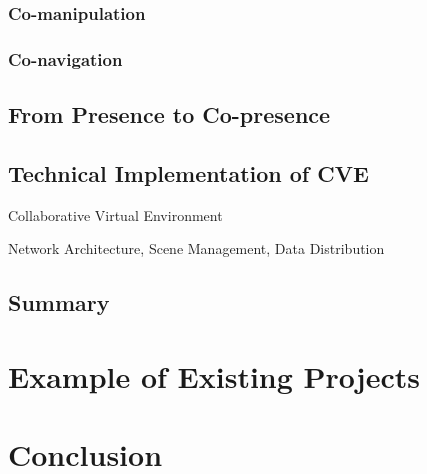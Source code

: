 \subsubsection{Co-manipulation}
\subsubsection{Co-navigation}

\subsection{From Presence to Co-presence}



\subsection{Technical Implementation of CVE}
Collaborative Virtual Environment

Network Architecture, Scene Management, Data Distribution

\subsection{Summary}

\section{Example of Existing Projects}


\section{Conclusion}

